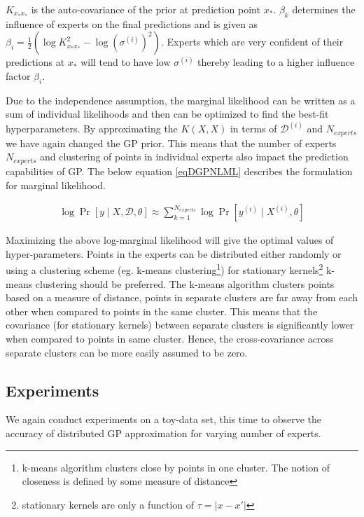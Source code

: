 $K_{x_{*}x_{*}}$ is the auto-covariance of the prior at prediction point $x_{*}$. $\beta_{k}$ determines the influence of experts on the final predictions \cite{cao2014generalized} and is given as $\beta_{i} = \frac{1}{2}(\log K_{x_{*}x_{*}}^{2} - \log(\sigma^{(i)})^{2})$. Experts which are very confident of their predictions at $x_{*}$ will tend to have low $\sigma^{(i)}$ thereby leading to a higher influence factor $\beta_{i}$.

Due to the independence assumption, the marginal likelihood can be written as a sum of individual likelihoods and then can be optimized to find the best-fit hyperparameters. By approximating the $K(X, X)$ in terms of $\mathcal{D}^{(i)}$ and $N_{experts}$ we have again changed the GP prior. This means that the number of experts $N_{experts}$ and clustering of points in individual experts also impact the prediction capabilities of GP. The below equation \ref{eqDGPNLML} describes the formulation for marginal likelihood. 

\begin{align}\label{eqDGPNLML}
    \log \Pr[y \mid X, \mathcal{D}, \theta] \approx \sum_{k=1}^{N_{experts}} \log \Pr[y^{(i)}\mid X^{(i)}, \theta]
 \end{align}

Maximizing the above log-marginal likelihood will give the optimal values of hyper-parameters. Points in the experts can be distributed either randomly or using a clustering scheme (eg. k-means clustering\footnote{k-means algorithm clusters close by points in one cluster. The notion of closeness is defined by some measure of distance}) for stationary kernels\footnote{stationary kernels are only a function of $\tau = |x-x'|$} k-means clustering should be preferred. The k-means algorithm clusters points based on a measure of distance, points in separate clusters are far away from each other when compared to points in the same cluster. This means that the covariance (for stationary kernels) between separate clusters is significantly lower when compared to points in same cluster. Hence, the cross-covariance across separate clusters can be more easily assumed to be zero.

\subsection{Experiments}\label{subSecDistributedExperiments}
We again conduct experiments on a toy-data set, this time to observe the accuracy of distributed GP approximation for varying number of experts. 

